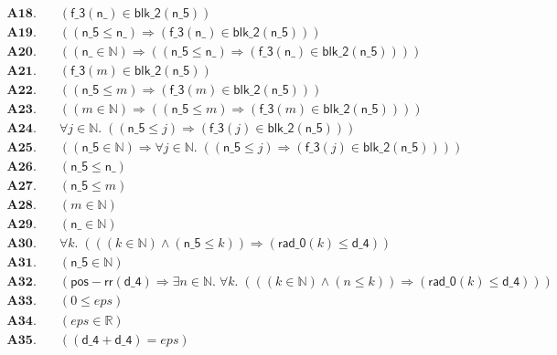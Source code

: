 \documentclass[11pt]{article}
\begin{document}
\begin{align*}
  \mathbf{A18.}\quad & (\mathsf{f\_3}(\mathsf{n\_}) \in \mathsf{blk\_2}(\mathsf{n\_5})) \\
  \mathbf{A19.}\quad & ((\mathsf{n\_5} \leq \mathsf{n\_}) \Rightarrow (\mathsf{f\_3}(\mathsf{n\_}) \in \mathsf{blk\_2}(\mathsf{n\_5}))) \\
  \mathbf{A20.}\quad & ((\mathsf{n\_} \in \mathbb{N}) \Rightarrow ((\mathsf{n\_5} \leq \mathsf{n\_}) \Rightarrow (\mathsf{f\_3}(\mathsf{n\_}) \in \mathsf{blk\_2}(\mathsf{n\_5})))) \\
  \mathbf{A21.}\quad & (\mathsf{f\_3}(m) \in \mathsf{blk\_2}(\mathsf{n\_5})) \\
  \mathbf{A22.}\quad & ((\mathsf{n\_5} \leq m) \Rightarrow (\mathsf{f\_3}(m) \in \mathsf{blk\_2}(\mathsf{n\_5}))) \\
  \mathbf{A23.}\quad & ((m \in \mathbb{N}) \Rightarrow ((\mathsf{n\_5} \leq m) \Rightarrow (\mathsf{f\_3}(m) \in \mathsf{blk\_2}(\mathsf{n\_5})))) \\
  \mathbf{A24.}\quad & \forall j \in \mathbb{N}.\; ((\mathsf{n\_5} \leq j) \Rightarrow (\mathsf{f\_3}(j) \in \mathsf{blk\_2}(\mathsf{n\_5}))) \\
  \mathbf{A25.}\quad & ((\mathsf{n\_5} \in \mathbb{N}) \Rightarrow \forall j \in \mathbb{N}.\; ((\mathsf{n\_5} \leq j) \Rightarrow (\mathsf{f\_3}(j) \in \mathsf{blk\_2}(\mathsf{n\_5})))) \\
  \mathbf{A26.}\quad & (\mathsf{n\_5} \leq \mathsf{n\_}) \\
  \mathbf{A27.}\quad & (\mathsf{n\_5} \leq m) \\
  \mathbf{A28.}\quad & (m \in \mathbb{N}) \\
  \mathbf{A29.}\quad & (\mathsf{n\_} \in \mathbb{N}) \\
  \mathbf{A30.}\quad & \forall k.\; (((k \in \mathbb{N}) \wedge (\mathsf{n\_5} \leq k)) \Rightarrow (\mathsf{rad\_0}(k) \leq \mathsf{d\_4})) \\
  \mathbf{A31.}\quad & (\mathsf{n\_5} \in \mathbb{N}) \\
  \mathbf{A32.}\quad & (\mathsf{pos{-}rr}(\mathsf{d\_4}) \Rightarrow \exists n \in \mathbb{N}.\; \forall k.\; (((k \in \mathbb{N}) \wedge (n \leq k)) \Rightarrow (\mathsf{rad\_0}(k) \leq \mathsf{d\_4}))) \\
  \mathbf{A33.}\quad & (0 \leq \mathit{eps}) \\
  \mathbf{A34.}\quad & (\mathit{eps} \in \mathbb{R}) \\
  \mathbf{A35.}\quad & ((\mathsf{d\_4} + \mathsf{d\_4}) = \mathit{eps}) \\

\end{align*}
\end{document}
